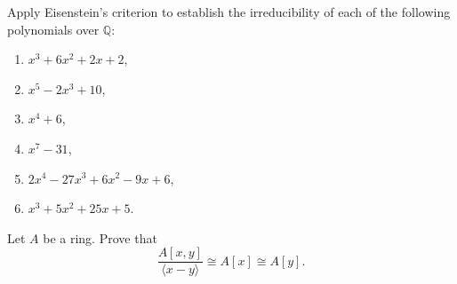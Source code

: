 \documentclass[
    11pt,a4paper,
]{exam}
\begin{document}
\begin{questions}
\question
Apply Eisenstein's criterion to establish the irreducibility of each of the following polynomials over $\mathbb{Q}$:
\begin{multicols}{2}
    \begin{enumerate}[label=(\roman*)]
        \item $x^3 + 6x^2 + 2x + 2$,
        \item $x^5 - 2x^3 + 10$,
        \item $x^4 + 6$,
        \item $x^7 - 31$,
        \item $2x^4 - 27x^3 + 6x^2 - 9x + 6$,
        \item $x^3 + 5x^2 + 25x + 5$.
    \end{enumerate}
\end{multicols}


\question
Let $A$ be a ring. Prove that
\[
\frac{A[x,y]}{\langle x - y \rangle} \cong A[x] \cong A[y].
\]

\end{questions}
\end{document}
